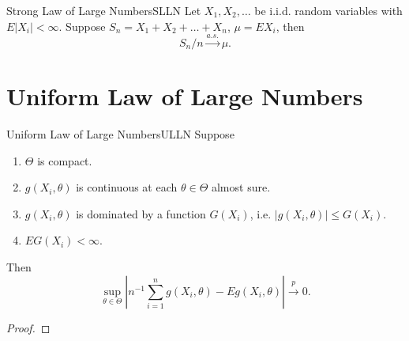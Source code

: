 \begin{theorem}{Strong Law of Large Numbers}{SLLN}
    Let $X_1,X_2,\ldots$ be i.i.d. random variables with $E|X_i|<\infty$. Suppose $S_n=X_1+X_2+\ldots+X_n$, $\mu=EX_i$, then
    \begin{equation}
        S_n/n\stackrel{a.s.}{\rightarrow}\mu.
    \end{equation}
\end{theorem}

\section{Uniform Law of Large Numbers}

\begin{theorem}{Uniform Law of Large Numbers}{ULLN}
    Suppose
    \begin{enumerate}
        \item $\Theta$ is compact.
        \item $g\left(X_{i},\theta\right)$ is continuous at each $\theta\in\Theta$ almost sure.
        \item $g\left(X_{i},\theta\right)$ is dominated by a function $G\left(X_{i}\right)$, i.e. $\left|g\left(X_{i},\theta\right)\right|\leq G\left(X_{i}\right)$.
        \item $EG\left(X_{i}\right)<\infty$.
    \end{enumerate}
    Then
    \begin{equation}
        \sup_{\theta\in\Theta}\left|n^{-1}\sum_{i=1}^{n}g\left(X_{i},\theta\right)-Eg\left(X_{i},\theta\right)\right|\stackrel{p}{\rightarrow}0.
    \end{equation}
\end{theorem}

\begin{proof}
    
\end{proof}

